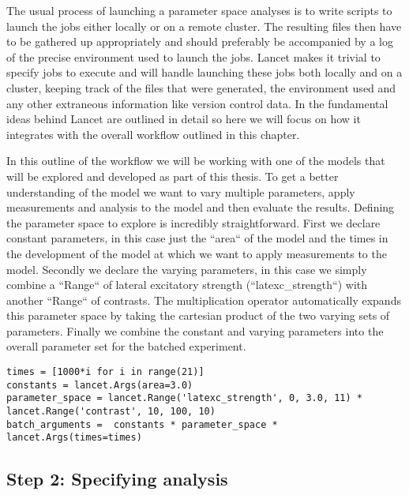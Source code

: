 The usual process of launching a parameter space analyses is to write
scripts to launch the jobs either locally or on a remote cluster. The
resulting files then have to be gathered up appropriately and should
preferably be accompanied by a log of the precise environment used to
launch the jobs. Lancet makes it trivial to specify jobs to execute
and will handle launching these jobs both locally and on a cluster,
keeping track of the files that were generated, the environment used
and any other extraneous information like version control data. In
\cite{Stevens2013a} the fundamental ideas behind Lancet are outlined
in detail so here we will focus on how it integrates with the overall
workflow outlined in this chapter.

In this outline of the workflow we will be working with one of the
models that will be explored and developed as part of this thesis. To
get a better understanding of the model we want to vary multiple
parameters, apply measurements and analysis to the model and then
evaluate the results. Defining the parameter space to explore is
incredibly straightforward. First we declare constant parameters, in
this case just the ``area`` of the model and the times in the
development of the model at which we want to apply measurements to the
model. Secondly we declare the varying parameters, in this case we
simply combine a ``Range`` of lateral excitatory strength
(``latexc\_strength``) with another ``Range`` of contrasts. The
multiplication operator automatically expands this parameter space by
taking the cartesian product of the two varying sets of
parameters. Finally we combine the constant and varying parameters
into the overall parameter set for the batched experiment.

\begin{minipage}{\linewidth}
\begin{lstlisting}
times = [1000*i for i in range(21)]
constants = lancet.Args(area=3.0)
parameter_space = lancet.Range('latexc_strength', 0, 3.0, 11) * lancet.Range('contrast', 10, 100, 10)
batch_arguments =  constants * parameter_space * lancet.Args(times=times)
\end{lstlisting}
\end{minipage}

\subsection{Step 2: Specifying analysis}

